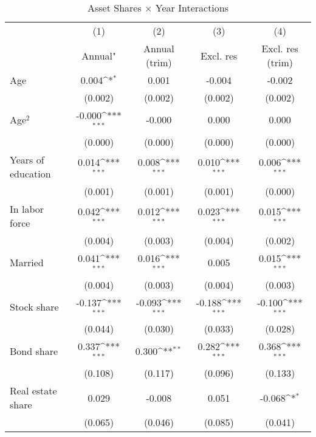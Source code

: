 \begin{table}[htbp]\centering
\def\sym#1{\ifmmode^{#1}\else\(^{#1}\)\fi}
\caption{Asset Shares × Year Interactions}
\begin{tabular}{l*{4}{c}}
\toprule
          &\multicolumn{1}{c}{(1)}&\multicolumn{1}{c}{(2)}&\multicolumn{1}{c}{(3)}&\multicolumn{1}{c}{(4)}\\
          &\multicolumn{1}{c}{Annual"}&\multicolumn{1}{c}{Annual (trim)}&\multicolumn{1}{c}{Excl. res}&\multicolumn{1}{c}{Excl. res (trim)}\\
\midrule
Age       &    0.004\sym{*}  &    0.001         &   -0.004         &   -0.002         \\
          &  (0.002)         &  (0.002)         &  (0.002)         &  (0.002)         \\
Age$^{2}$ &   -0.000\sym{***}&   -0.000         &    0.000         &    0.000         \\
          &  (0.000)         &  (0.000)         &  (0.000)         &  (0.000)         \\
Years of education&    0.014\sym{***}&    0.008\sym{***}&    0.010\sym{***}&    0.006\sym{***}\\
          &  (0.001)         &  (0.001)         &  (0.001)         &  (0.000)         \\
In labor force&    0.042\sym{***}&    0.012\sym{***}&    0.023\sym{***}&    0.015\sym{***}\\
          &  (0.004)         &  (0.003)         &  (0.004)         &  (0.002)         \\
Married   &    0.041\sym{***}&    0.016\sym{***}&    0.005         &    0.015\sym{***}\\
          &  (0.004)         &  (0.003)         &  (0.004)         &  (0.003)         \\
Stock share&   -0.137\sym{***}&   -0.093\sym{***}&   -0.188\sym{***}&   -0.100\sym{***}\\
          &  (0.044)         &  (0.030)         &  (0.033)         &  (0.028)         \\
Bond share&    0.337\sym{***}&    0.300\sym{**} &    0.282\sym{***}&    0.368\sym{***}\\
          &  (0.108)         &  (0.117)         &  (0.096)         &  (0.133)         \\
Real estate share&    0.029         &   -0.008         &    0.051         &   -0.068\sym{*}  \\
          &  (0.065)         &  (0.046)         &  (0.085)         &  (0.041)         \\

\end{tabular}
\end{table}
